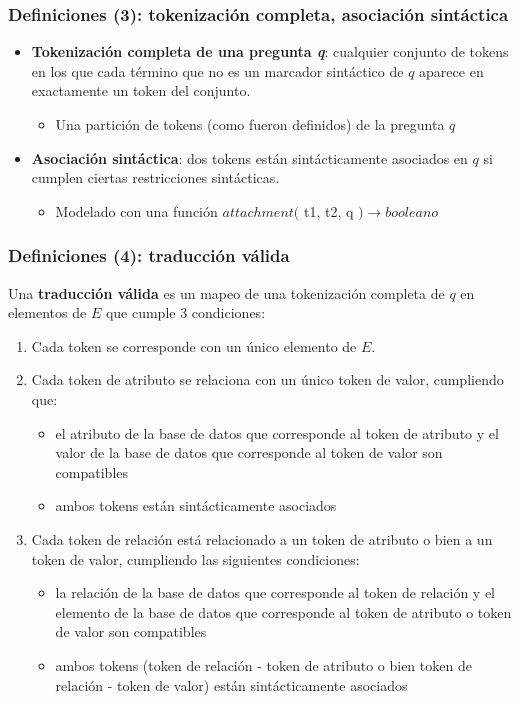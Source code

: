\documentclass{beamer}
\begin{document}
\begin{frame}
\frametitle{Definiciones (3): tokenización completa, asociación sintáctica}

  \begin{itemize}
    \item \textbf{Tokenización completa de una pregunta \textit{q}}:  cualquier conjunto de tokens en los que cada término que no es un marcador sintáctico de $q$ aparece en exactamente un token del conjunto.
    \begin{itemize}
      \item Una partición de tokens (como fueron definidos) de la pregunta $q$
    \end{itemize} 
    \item \textbf{Asociación sintáctica}: dos tokens están sintácticamente asociados en $q$ si cumplen ciertas restricciones sintácticas.
    \begin{itemize}
      \item Modelado con una función $attachment($ t1, t2, q $) \rightarrow booleano$
    \end{itemize} 
   \end{itemize}
\end{frame}

\fontsize{9.5pt}{7.2}\selectfont
\begin{frame}[<+->]
\frametitle{Definiciones (4): traducción válida}
 Una \textbf{traducción válida} es un mapeo de una tokenización completa de $q$ en elementos de $E$ que cumple 3 condiciones:
\begin{enumerate}
  \item Cada token se corresponde con un único elemento de $E$.
  \item Cada token de atributo se relaciona con un único token de valor, cumpliendo que:
  \begin{itemize}
    \fontsize{9.5pt}{7.2}\selectfont
    \item el atributo de la base de datos que corresponde al token de atributo y el valor de la base de datos que corresponde al token de valor son compatibles
    \item ambos tokens están sintácticamente asociados
   \end{itemize}
  \item Cada token de relación está relacionado a un token de atributo o bien a un token de valor, cumpliendo las siguientes condiciones:

  \begin{itemize}
    \fontsize{9.5pt}{7.2}\selectfont
    \item la relación de la base de datos que corresponde al token de relación y el elemento de la base de datos que corresponde al token de atributo o token de valor son compatibles
    \item ambos tokens (token de relación - token de atributo o bien token de relación - token de valor) están sintácticamente asociados
  \end{itemize}
\end{enumerate}
\end{frame}
\end{document}
